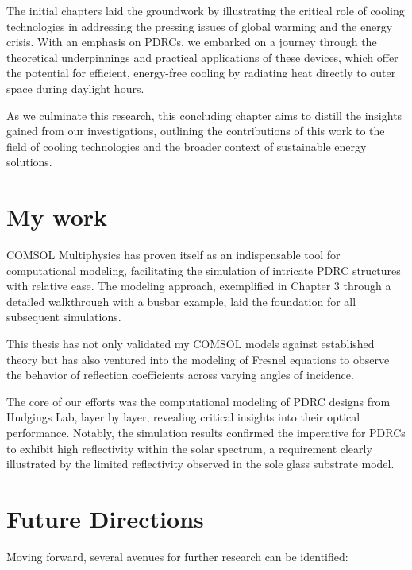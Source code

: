 The initial chapters laid the groundwork by illustrating the critical role of cooling technologies in addressing the pressing issues of global warming and the energy crisis. With an emphasis on PDRCs, we embarked on a journey through the theoretical underpinnings and practical applications of these devices, which offer the potential for efficient, energy-free cooling by radiating heat directly to outer space during daylight hours.

As we culminate this research, this concluding chapter aims to distill the insights gained from our investigations, outlining the contributions of this work to the field of cooling technologies and the broader context of sustainable energy solutions.

\section{My work}

COMSOL Multiphysics \texttrademark \space has proven itself as an indispensable tool for computational modeling, facilitating the simulation of intricate PDRC structures with relative ease. The modeling approach, exemplified in Chapter 3 through a detailed walkthrough with a busbar example, laid the foundation for all subsequent simulations.

This thesis has not only validated my COMSOL models against established theory but has also ventured into the modeling of Fresnel equations to observe the behavior of reflection coefficients across varying angles of incidence.

The core of our efforts was the computational modeling of PDRC designs from Hudgings Lab, layer by layer, revealing critical insights into their optical performance. Notably, the simulation results confirmed the imperative for PDRCs to exhibit high reflectivity within the solar spectrum, a requirement clearly illustrated by the limited reflectivity observed in the sole glass substrate model.

\section{Future Directions}

Moving forward, several avenues for further research can be identified:

